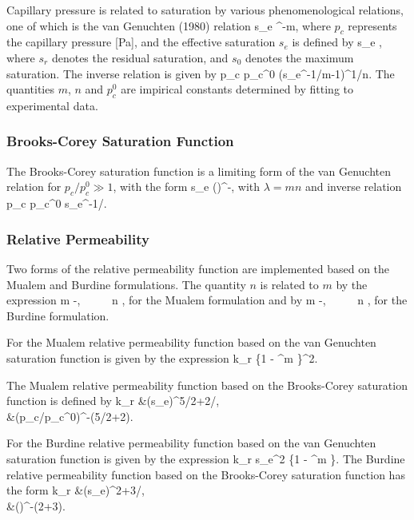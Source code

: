 \documentclass[12pt]{article}
\begin{document}
Capillary pressure is related to saturation by various 
phenomenological relations, one of which is the van Genuchten 
(1980) relation 
\EQ\label{seff}
s_e \eq {}^{-m}, 
\EN 
where $p_c$ represents the capillary pressure [Pa], and the effective saturation $s_e$ is defined by 
\EQ 
s_e \eq {}, 
\EN 
where $s_r$ denotes the residual saturation, and $s_0$ denotes 
the maximum saturation. 
The inverse relation is given by
\EQ
p_c \eq p_c^0 \left(s_e^{-1/m}-1\right)^{1/n}.
\EN
The quantities $m$, $n$ and $p_c^0$ are impirical constants determined by fitting to experimental data.

\subsubsection{Brooks-Corey Saturation Function} 

The Brooks-Corey saturation function is a limiting form of the van Genuchten relation for $p_c/p_c^0 \gg 1$, with the form
\EQ
s_e \eq \left(\right)^{-\lambda},
\EN
with $\lambda=mn$ and inverse relation
\EQ
p_c \eq p_c^0 s_e^{-1/\lambda}.
\EN

\subsubsection{Relative Permeability}

Two forms of the relative permeability function are implemented based on the Mualem and Burdine formulations.
The quantity $n$ is related to $m$ by 
the expression 
\EQ\label{lambda_mualem} 
m -, \ \ \ \ \ n \eq {}, 
\EN 
for the Mualem formulation and by
\EQ\label{lambda_burdine} 
m -, \ \ \ \ \ n \eq {}, 
\EN 
for the Burdine formulation.

For the Mualem relative permeability function based on the van Genuchten saturation function is given by the expression 
\EQ\label{krl_mualem} 
k_{r} \eq {} \left\{1 - ^m \right\}^2. 
\EN 

The Mualem relative permeability function based on the Brooks-Corey saturation function is defined by 
\BA
k_r &\eq \big(s_e\big)^{5/2+2/\lambda},\\
&\eq \big(p_c/p_c^0\big)^{-(5\lambda/2+2)}.
\EA

For the Burdine relative permeability function based on the van Genuchten saturation function is given by the expression
\EQ\label{krl_burdine} 
k_{r} \eq s_e^2 \left\{1 - ^m \right\}. 
\EN 
The Burdine relative permeability function based on the Brooks-Corey saturation function has the form
\BA
k_r &\eq \big(s_e\big)^{2+3/\lambda},\\
&\eq \left(\right)^{-(2+3\lambda)}.
\EA
\end{document}
